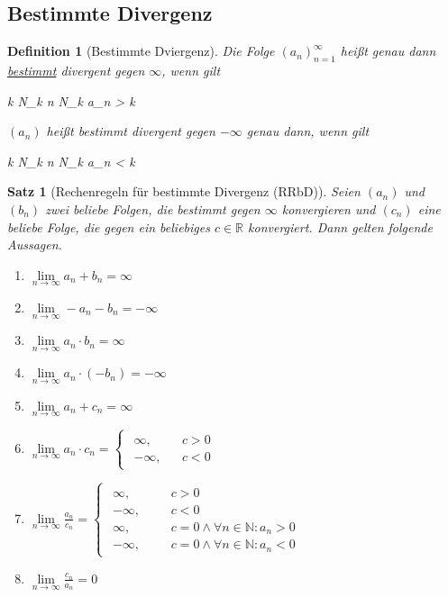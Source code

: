 \documentclass{article}
\newtheorem{thm}{Satz}[section]
\newtheorem{defn}{Definition}[section]
\newenvironment{aleq*}{\begin{equation*}\begin{aligned}}{\end{aligned}\end{equation*}}
\begin{document}
	\subsection{Bestimmte Divergenz}
	\begin{defn}[Bestimmte Dviergenz]
		Die Folge \((a_n)_{n=1}^\infty\) heißt genau dann \underline{bestimmt} divergent gegen \(\infty\), wenn gilt
		\begin{aleq*}
			\forall k \colon \exists N_k \colon \forall n \geq N_k \colon a_n > k 
		\end{aleq*}
		
		\((a_n)\) heißt bestimmt divergent gegen \(- \infty\) genau dann, wenn gilt
		\begin{aleq*}
			\forall k \colon \exists N_k \colon \forall n \geq N_k \colon a_n < k \text{.}
		\end{aleq*}
	\end{defn}
	
	\begin{thm}[Rechenregeln für bestimmte Divergenz (RRbD)]
		Seien \((a_n)\) und \((b_n)\) zwei beliebe Folgen, die bestimmt gegen \(\infty\) konvergieren und \((c_n)\) eine beliebe Folge, die gegen ein beliebiges \(c \in \mathbb{R}\) konvergiert. Dann gelten folgende Aussagen.
		\begin{enumerate}
			\item \(\lim\limits_{n \to \infty} a_n + b_n = \infty\)
			\item \(\lim\limits_{n \to \infty} -a_n - b_n = -\infty\)
			\item \(\lim\limits_{n \to \infty} a_n \cdot b_n = \infty\)
			\item \(\lim\limits_{n \to \infty} a_n \cdot (- b_n) = -\infty\)
			\item \(\lim\limits_{n \to \infty} a_n + c_n = \infty\)
			\item \(\lim\limits_{n \to \infty} a_n \cdot c_n = 
			\begin{cases}
				\begin{aligned}
					\infty, &&c > 0 \\
					-\infty, &&c < 0
				\end{aligned}
			\end{cases}\)
			\item \(\lim\limits_{n \to \infty} \frac{a_n}{c_n} = 
			\begin{cases}
				\begin{aligned}
					\infty, &&&c > 0 \\
					-\infty, &&&c< 0 \\
					\infty, &&&c = 0 \land \forall n \in \mathbb{N} \colon a_n > 0 \\
					-\infty, &&&c = 0 \land \forall n \in \mathbb{N} \colon a_n < 0
				\end{aligned}
			\end{cases}\)
			\item \(\lim\limits_{n \to \infty} \frac{c_n}{a_n} = 0\)
		\end{enumerate}
	\end{thm}
	
\end{document}

